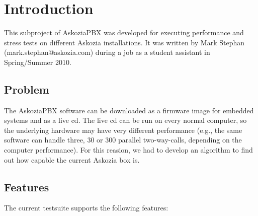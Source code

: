 \section{Introduction}
\label{sec:introduction}

This subproject of AskoziaPBX was developed for executing performance and stress tests on different Askozia installations.
It was written by Mark Stephan \newline (mark.stephan@askozia.com) during a job as a student assistant in Spring/Summer 2010. 


\subsection{Problem}%
The AskoziaPBX software can be downloaded as a firmware image for embedded systems and as a live cd.
The live cd can be run on every normal computer, so the underlying hardware may have very different
performance (e.g., the same software can handle three, 30 or 300 parallel two-way-calls,
depending on the computer performance). For this reasion, we had to develop an algorithm to find out
how capable the current Askozia box is.
 
\subsection{Features}%
The current testsuite supports the following features:

